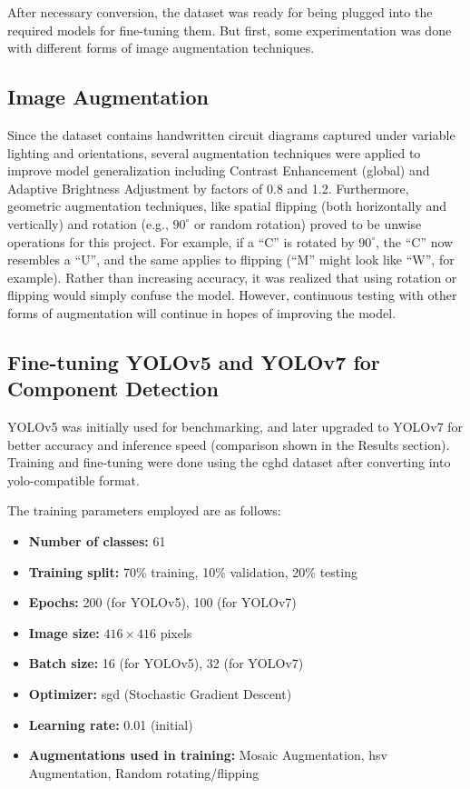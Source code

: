 After necessary conversion, the dataset was ready for being plugged into the required models for fine-tuning them. But first, some experimentation was done with different forms of image augmentation techniques.

\subsection{Image Augmentation}

Since the dataset contains handwritten circuit diagrams captured under variable lighting and orientations, several augmentation techniques were applied to improve model generalization including Contrast Enhancement (global) and Adaptive Brightness Adjustment by factors of 0.8 and 1.2. Furthermore, geometric augmentation techniques, like spatial flipping (both horizontally and vertically) and rotation (e.g., $90^\circ$ or random rotation) proved to be unwise operations for this project. For example, if a ``C'' is rotated by $90^\circ$, the ``C'' now resembles a ``U'', and the same applies to flipping (``M'' might look like ``W'', for example). Rather than increasing accuracy, it was realized that using rotation or flipping would simply confuse the model. However, continuous testing with other forms of augmentation will continue in hopes of improving the model.

\subsection{Fine-tuning YOLOv5 and YOLOv7 for Component Detection}

YOLOv5 was initially used for benchmarking, and later upgraded to YOLOv7 for better accuracy and inference speed (comparison shown in the Results section). Training and fine-tuning were done using the \gls{cghd} dataset after converting into \gls{yolo}-compatible format.

The training parameters employed are as follows:

\begin{itemize}
    \item \textbf{Number of classes:} 61
    \item \textbf{Training split:} 70\% training, 10\% validation, 20\% testing
    \item \textbf{Epochs:} 200 (for YOLOv5), 100 (for YOLOv7)
    \item \textbf{Image size:} $416 \times 416$ pixels
    \item \textbf{Batch size:} 16 (for YOLOv5), 32 (for YOLOv7)
    \item \textbf{Optimizer:} \gls{sgd} (Stochastic Gradient Descent)
    \item \textbf{Learning rate:} 0.01 (initial)
    \item \textbf{Augmentations used in training:} Mosaic Augmentation, \gls{hsv} Augmentation, Random rotating/flipping
\end{itemize}

